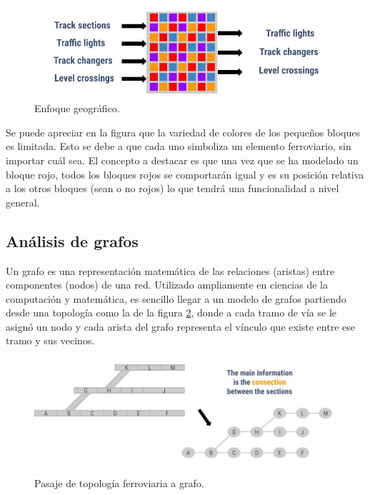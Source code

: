 		\begin{figure}[h]
		\centering
			\includegraphics[scale=.55]{./Figures/Geografico}
			\caption{Enfoque geográfico.}
			\label{fig:Enfoque_Geografico}
		\end{figure}

	Se puede apreciar en la figura que la variedad de colores de los pequeños bloques es limitada. Esto se debe a que cada uno simboliza un elemento ferroviario, sin importar cuál sea. El concepto a destacar es que una vez que se ha modelado un bloque rojo, todos los bloques rojos se comportarán igual y es su posición relativa a los otros bloques (sean o no rojos) lo que tendrá una funcionalidad a nivel general.
	
	\subsection{Análisis de grafos}
		
		Un grafo es una representación matemática de las relaciones (aristas) entre componentes (nodos) de una red. Utilizado ampliamente en ciencias de la computación y matemática, es sencillo llegar a un modelo de grafos partiendo desde una topología como la de la figura \ref{fig:Topologia_Grafo}, donde a cada tramo de vía se le asignó un nodo y cada arista del grafo representa el vínculo que existe entre ese tramo y sus vecinos.
		
		\begin{figure}[h]
		\centering
			\includegraphics[scale=.4]{./Figures/Topologia_grafo}
			\caption{Pasaje de topología ferroviaria a grafo.}
			\label{fig:Topologia_Grafo}
		\end{figure}
	
